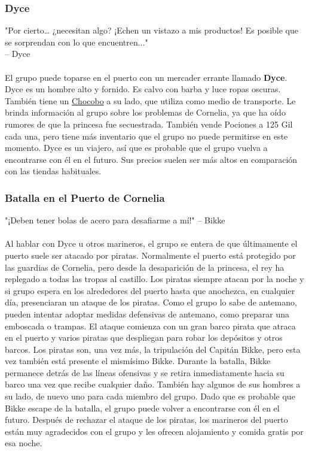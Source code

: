 \subsubsection*{Dyce}
"Por cierto… ¿necesitan algo? ¡Echen un vistazo a mis productos! Es posible que se sorprendan con lo que encuentren..."\\
\indent-- Dyce \\\\
El grupo puede toparse en el puerto con un mercader errante llamado \textbf{Dyce}. Dyce es un hombre alto y fornido. Es calvo con barba y luce ropas oscuras. También tiene un \hyperlink{chocobo}{Chocobo} a su lado, que utiliza como medio de transporte. Le brinda información al grupo sobre los problemas de Cornelia, ya que ha oído rumores de que la princesa fue secuestrada. También vende Pociones a 125 Gil cada una, pero tiene más inventario que el grupo no puede permitirse en este momento. Dyce es un viajero, así que es probable que el grupo vuelva a encontrarse con él en el futuro. Sus precios suelen ser más altos en comparación con las tiendas habituales.

\subsubsection*{Batalla en el Puerto de Cornelia}
"¡Deben tener bolas de acero para desafiarme a mí!" -- Bikke \\\\
Al hablar con Dyce u otros marineros, el grupo se entera de que últimamente el puerto suele ser atacado por piratas. Normalmente el puerto está protegido por las guardias de Cornelia, pero desde la desaparición de la princesa, el rey ha replegado a todas las tropas al castillo. Los piratas siempre atacan por la noche y si grupo espera en los alrededores del puerto hasta que anochezca, en cualquier día, presenciaran un ataque de los piratas. Como el grupo lo sabe de antemano, pueden intentar adoptar medidas defensivas de antemano, como preparar una emboscada o trampas. El ataque comienza con un gran barco pirata que atraca en el puerto y varios piratas que despliegan para robar los depósitos y otros barcos. Los piratas son, una vez más, la tripulación del Capitán Bikke, pero esta vez también está presente el mismísimo Bikke. Durante la batalla, Bikke permanece detrás de las líneas ofensivas y se retira inmediatamente hacia su barco una vez que recibe cualquier daño. También hay algunos de sus hombres a su lado, de nuevo uno para cada miembro del grupo. Dado que es probable que Bikke escape de la batalla, el grupo puede volver a encontrarse con él en el futuro. Después de rechazar el ataque de los piratas, los marineros del puerto están muy agradecidos con el grupo y les ofrecen alojamiento y comida gratis por esa noche.
\vfill


\clearpage
